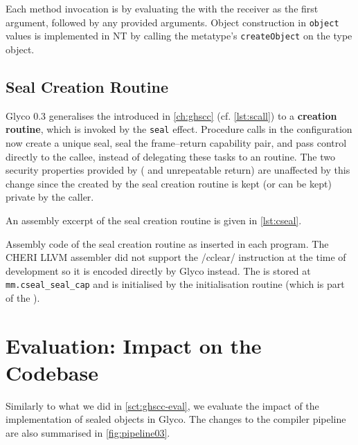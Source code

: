 \documentclass[main.tex]{subfiles}
\begin{document}
Each method invocation is \lowered{} by evaluating the  with the receiver as the first argument, followed by any provided arguments. Object construction in \texttt{object} values is implemented in NT by calling the metatype's \texttt{createObject}  on the type object.

\subsection{Seal Creation Routine}
Glyco 0.3 generalises the   introduced in \cref{ch:ghscc} (cf. \cref{lst:scall}) to a \textbf{ creation routine}, which is invoked by the \texttt{seal} effect. Procedure calls in the  configuration now create a unique seal, seal the frame–return capability pair, and pass control directly to the callee, instead of delegating these tasks to an  routine. The two security properties provided by  ( and unrepeatable return) are unaffected by this change since the  created by the seal creation routine is kept (or can be kept) private by the caller.

An assembly excerpt of the seal creation routine is given in \cref{lst:cseal}.
\begin{listing}[ht]
	\caption{Assembly code of the seal creation routine as inserted in each program. The CHERI LLVM assembler did not support the \iasm/cclear/ instruction at the time of development so it is encoded directly by Glyco instead. The  is stored at \texttt{mm.cseal_seal_cap} and is initialised by the initialisation routine (which is part of the ).}
	\label{lst:cseal}
\end{listing}

\section{Evaluation: Impact on the Codebase} \label{sct:obj-eval}
Similarly to what we did in \cref{sct:ghscc-eval}, we evaluate the impact of the implementation of sealed objects in Glyco. The changes to the compiler pipeline are also summarised in \cref{fig:pipeline03}.
\end{document}

